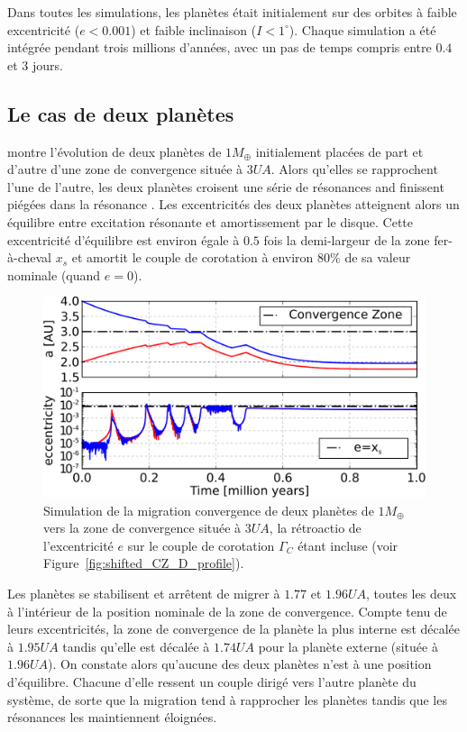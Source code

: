 \bigskip

Dans toutes les simulations, les planètes était initialement sur des orbites à faible excentricité ($e<0.001$) et faible inclinaison ($I<1^\circ$). Chaque simulation a été intégrée pendant trois millions d'années, avec un pas de temps compris entre $0.4$ et $3$ jours.

\subsection{Le cas de deux planètes}
 montre l'évolution de deux planètes de $1\unit{M_\oplus}$ initialement placées de part et d'autre d'une zone de convergence située à $3\unit{UA}$. Alors qu'elles se rapprochent l'une de l'autre, les deux planètes croisent une série de résonances and finissent piégées dans la résonance . Les excentricités des deux planètes atteignent alors un équilibre entre excitation résonante et amortissement par le disque. Cette excentricité d'équilibre est environ égale à $0.5$ fois la demi-largeur de la zone fer-à-cheval $x_s$ et amortit le couple de corotation à environ $80\%$ de sa valeur nominale (quand $e=0$). 

\begin{figure}[htbp]
\centering
\includegraphics[width=\linewidth]{figure/shifted/corotation_damping_influence.pdf}
\caption{Simulation de la migration convergence de deux planètes de $1\unit{M_\oplus}$ vers la zone de convergence située à $3\unit{UA}$, la rétroactio de l'excentricité $e$ sur le couple de corotation $\Gamma_C$ étant incluse (voir Figure~\ref{fig:shifted_CZ_D_profile}).}
\label{fig:two-planets}
\end{figure}

Les planètes se stabilisent et arrêtent de migrer à $1.77$ et $1.96\unit{UA}$, toutes les deux à l'intérieur de la position nominale de la zone de convergence. Compte tenu de leurs excentricités, la zone de convergence de la planète la plus interne est décalée à $1.95\unit{UA}$ tandis qu'elle est décalée à $1.74\unit{UA}$ pour la planète externe (située à $1.96\unit{UA}$). On constate alors qu'aucune des deux planètes n'est à une position d'équilibre. Chacune d'elle ressent un couple dirigé vers l'autre planète du système, de sorte que la migration tend à rapprocher les planètes tandis que les résonances les maintiennent éloignées.

